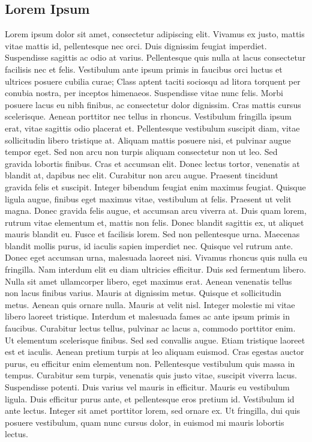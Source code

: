 \documentclass[ 6pt, a4paper, landscape ]{scrartcl}
\begin{document}
\begin{multicols}{4}
\begin{breakbox}
\subsection{Lorem Ipsum}
Lorem ipsum dolor sit amet, consectetur adipiscing elit. Vivamus ex justo,
mattis vitae mattis id, pellentesque nec orci. Duis dignissim feugiat imperdiet.
Suspendisse sagittis ac odio at varius. Pellentesque quis nulla at lacus
consectetur facilisis nec et felis. Vestibulum ante ipsum primis in faucibus
orci luctus et ultrices posuere cubilia curae; Class aptent taciti sociosqu ad
litora torquent per conubia nostra, per inceptos himenaeos. Suspendisse vitae
nunc felis. Morbi posuere lacus eu nibh finibus, ac consectetur dolor dignissim.
Cras mattis cursus scelerisque. Aenean porttitor nec tellus in rhoncus.
Vestibulum fringilla ipsum erat, vitae sagittis odio placerat et. Pellentesque
vestibulum suscipit diam, vitae sollicitudin libero tristique at. Aliquam mattis
posuere nisi, et pulvinar augue tempor eget. Sed non arcu non turpis aliquam
consectetur non ut leo.
Sed gravida lobortis finibus. Cras et accumsan elit. Donec lectus tortor,
venenatis at blandit at, dapibus nec elit. Curabitur non arcu augue. Praesent
tincidunt gravida felis et suscipit. Integer bibendum feugiat enim maximus
feugiat. Quisque ligula augue, finibus eget maximus vitae, vestibulum at felis.
Praesent ut velit magna. Donec gravida felis augue, et accumsan arcu viverra at.
Duis quam lorem, rutrum vitae elementum et, mattis non felis. Donec blandit
sagittis ex, ut aliquet mauris blandit eu. Fusce et facilisis lorem. Sed non
pellentesque urna. Maecenas blandit mollis purus, id iaculis sapien imperdiet
nec.
Quisque vel rutrum ante. Donec eget accumsan urna, malesuada laoreet nisi.
Vivamus rhoncus quis nulla eu fringilla. Nam interdum elit eu diam ultricies
efficitur. Duis sed fermentum libero. Nulla sit amet ullamcorper libero, eget
maximus erat. Aenean venenatis tellus non lacus finibus varius. Mauris at
dignissim metus. Quisque et sollicitudin metus.
Aenean quis ornare nulla. Mauris at velit nisl. Integer molestie mi vitae libero
laoreet tristique. Interdum et malesuada fames ac ante ipsum primis in faucibus.
Curabitur lectus tellus, pulvinar ac lacus a, commodo porttitor enim. Ut
elementum scelerisque finibus. Sed sed convallis augue. Etiam tristique laoreet
est et iaculis.
Aenean pretium turpis at leo aliquam euismod. Cras egestas auctor purus, eu
efficitur enim elementum non. Pellentesque vestibulum quis massa in tempus.
Curabitur sem turpis, venenatis quis justo vitae, suscipit viverra lacus.
Suspendisse potenti. Duis varius vel mauris in efficitur. Mauris eu vestibulum
ligula. Duis efficitur purus ante, et pellentesque eros pretium id. Vestibulum
id ante lectus. Integer sit amet porttitor lorem, sed ornare ex. Ut fringilla,
dui quis posuere vestibulum, quam nunc cursus dolor, in euismod mi mauris
lobortis lectus.


\end{breakbox}
\end{multicols}
\end{document}
